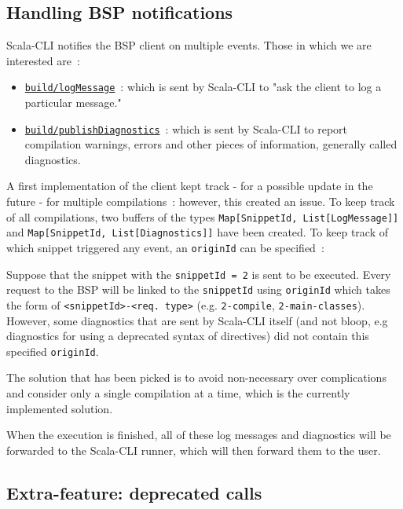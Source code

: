 \documentclass{article}
\begin{document}
\subsection{Handling BSP notifications}

Scala-CLI notifies the BSP client on multiple events. Those in which we are interested are~:

\begin{itemize}
    \item \href{https://build-server-protocol.github.io/docs/specification#log-message}{\lstinline{build/logMessage}}~: which is sent by Scala-CLI to "ask the client to log a particular message."
    \item \href{https://build-server-protocol.github.io/docs/specification#publish-diagnostics}{\lstinline{build/publishDiagnostics}}~: which is sent by Scala-CLI to report compilation warnings, errors and other pieces of information, generally called diagnostics.
\end{itemize}

A first implementation of the client kept track - for a possible update in the future - for multiple compilations~: however, this created an issue. To keep track of all compilations, two buffers of the types \lstinline{Map[SnippetId, List[LogMessage]]} and \lstinline{Map[SnippetId, List[Diagnostics]]} have been created. To keep track of which snippet triggered any event, an \lstinline{originId} can be specified~:

Suppose that the snippet with the \lstinline{snippetId = 2} is sent to be executed. Every request to the BSP will be linked to the \lstinline{snippetId} using \lstinline{originId} which takes the form of \lstinline{<snippetId>-<req. type>} (e.g. \lstinline{2-compile}, \lstinline{2-main-classes}). However, some diagnostics that are sent by Scala-CLI itself (and not bloop, e.g diagnostics for using a deprecated syntax of directives) did not contain this specified \lstinline{originId}.

The solution that has been picked is to avoid non-necessary over complications and consider only a single compilation at a time, which is the currently implemented solution.

When the execution is finished, all of these log messages and diagnostics will be forwarded to the Scala-CLI runner, which will then forward them to the user.

\subsection{Extra-feature: deprecated calls}
\end{document}
